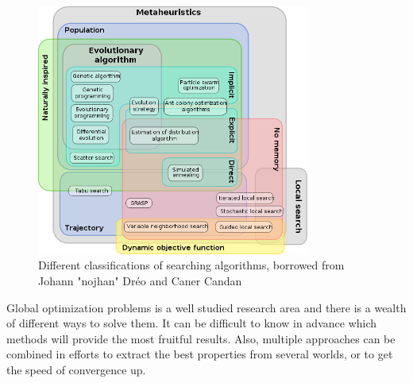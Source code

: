 \begin{figure}
    \centering
    \includegraphics[width=0.8\textwidth]{figs/630px-Metaheuristics_classification.png}
    \caption{Different classifications of searching algorithms, borrowed from Johann "nojhan" Dréo and Caner Candan \cite{wikimetaheuristics}}
    \label{fig:metaheuristics}
\end{figure}

Global optimization problems is a well studied research area and there is a
wealth of different ways to solve them. It can be difficult to know in advance
which methods will provide the most fruitful results. Also, multiple approaches
can be combined in efforts to extract the best properties from several worlds,
or to get the speed of convergence up.

